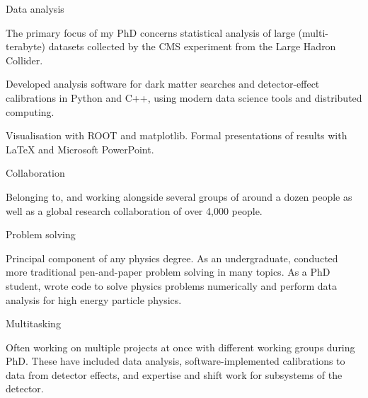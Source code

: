 
\newcommand{\vpaddingskills}{\vspace{1mm}}

\begin{cventries}

    \cventry
    {} %
    {Data analysis} %
    {} %
    {} %
    {
      \begin{cvitems}
        \item {The primary focus of my PhD concerns statistical analysis of large (multi-terabyte) datasets collected by the CMS experiment from the Large Hadron Collider.}
        \item {Developed analysis software for dark matter searches and detector-effect calibrations in Python and C++, using modern data science tools and distributed computing.}
        \item{Visualisation with ROOT and matplotlib. Formal presentations of results with LaTeX and Microsoft PowerPoint.}
        \vpaddingskills
        \end{cvitems}
    }

    \cventry
    {}
    {Collaboration}
    {}
    {}
    {
      \begin{cvitems}
        \item {Belonging to, and working alongside several groups of around a dozen people as well as a global research collaboration of over 4,000 people.}
        \vpaddingskills
        \end{cvitems}
    }

    \cventry
    {}
    {Problem solving}
    {}
    {}
    {
      \begin{cvitems}
        \item {Principal component of any physics degree. As an undergraduate, conducted more traditional pen-and-paper problem solving in many topics. As a PhD student, wrote code to solve physics problems numerically and perform data analysis for high energy particle physics.}
        \vpaddingskills
        \end{cvitems}
    }

    \cventry
    {}
    {Multitasking}
    {}
    {}
    {
      \begin{cvitems}
        \item {Often working on multiple projects at once with different working groups during PhD. These have included data analysis, software-implemented calibrations to data from detector effects, and expertise and shift work for subsystems of the detector.}
        \vpaddingskills
        \end{cvitems}
    }


\end{cventries}
